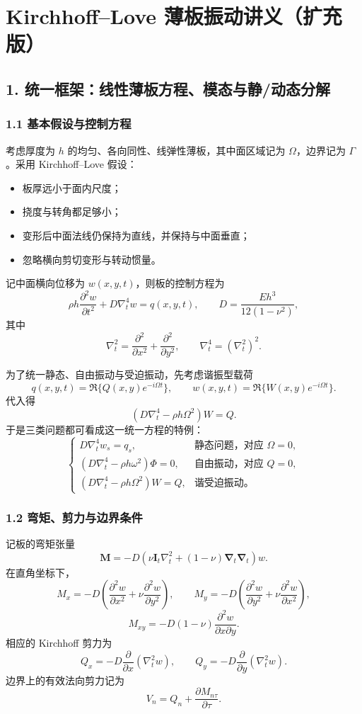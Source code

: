 \documentclass[12pt]{ctexart}
\begin{document}
\section*{Kirchhoff--Love 薄板振动讲义（扩充版）}

\subsection*{1. 统一框架：线性薄板方程、模态与静/动态分解}

\subsubsection*{1.1 基本假设与控制方程}
考虑厚度为 \(h\) 的均匀、各向同性、线弹性薄板，其中面区域记为 \(\Omega\)，边界记为 \(\Gamma\)。采用 Kirchhoff--Love 假设：
\begin{itemize}
\item 板厚远小于面内尺度；
\item 挠度与转角都足够小；
\item 变形后中面法线仍保持为直线，并保持与中面垂直；
\item 忽略横向剪切变形与转动惯量。
\end{itemize}

记中面横向位移为 \(w(x,y,t)\)，则板的控制方程为
\[
\rho h \frac{\partial^2 w}{\partial t^2} + D \nabla_t^4 w = q(x,y,t),
\qquad
D=\frac{Eh^3}{12(1-\nu^2)},
\]
其中
\[
\nabla_t^2=\frac{\partial^2}{\partial x^2}+\frac{\partial^2}{\partial y^2},
\qquad
\nabla_t^4=(\nabla_t^2)^2.
\]

为了统一静态、自由振动与受迫振动，先考虑谐振型载荷
\[
q(x,y,t)=\Re\{Q(x,y)e^{-i\Omega t}\},
\qquad
w(x,y,t)=\Re\{W(x,y)e^{-i\Omega t}\}.
\]
代入得
\[
\left(D\nabla_t^4-\rho h \Omega^2\right)W=Q.
\]
于是三类问题都可看成这一统一方程的特例：
\[
\begin{cases}
D\nabla_t^4 w_s=q_s, & \text{静态问题，对应 } \Omega=0,\\[4pt]
\left(D\nabla_t^4-\rho h \omega^2\right)\Phi=0, & \text{自由振动，对应 } Q=0,\\[4pt]
\left(D\nabla_t^4-\rho h \Omega^2\right)W=Q, & \text{谐受迫振动。}
\end{cases}
\]

\subsubsection*{1.2 弯矩、剪力与边界条件}
记板的弯矩张量
\[
\bm M=-D\left(\nu \bm I_t \nabla_t^2 +(1-\nu)\bm\nabla_t\bm\nabla_t\right)w.
\]
在直角坐标下，
\[
M_x=-D\left(\frac{\partial^2 w}{\partial x^2}+\nu\frac{\partial^2 w}{\partial y^2}\right),
\qquad
M_y=-D\left(\frac{\partial^2 w}{\partial y^2}+\nu\frac{\partial^2 w}{\partial x^2}\right),
\]
\[
M_{xy}=-D(1-\nu)\frac{\partial^2 w}{\partial x\partial y}.
\]
相应的 Kirchhoff 剪力为
\[
Q_x=-D\frac{\partial}{\partial x}\left(\nabla_t^2 w\right),
\qquad
Q_y=-D\frac{\partial}{\partial y}\left(\nabla_t^2 w\right).
\]
边界上的有效法向剪力记为
\[
V_n = Q_n+\frac{\partial M_{n\tau}}{\partial \tau}.
\]
\end{document}
